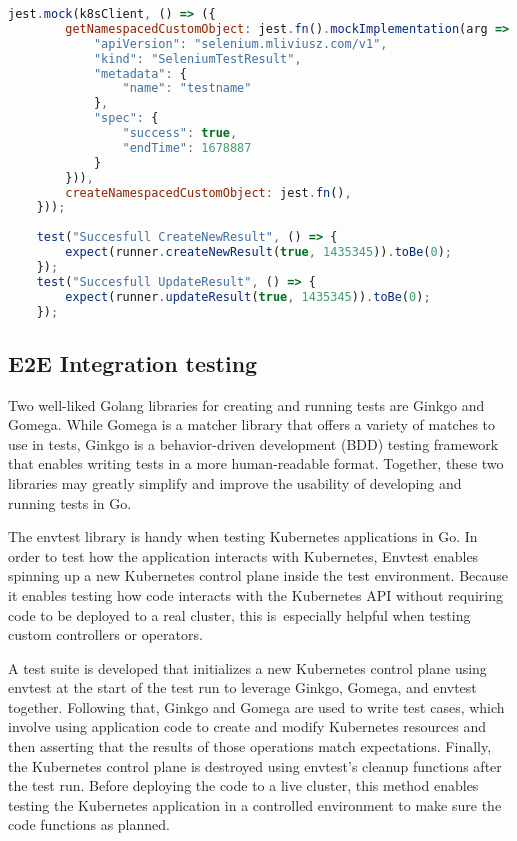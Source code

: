 \begin{lstlisting}[language={JavaScript}]
	jest.mock(k8sClient, () => ({
		getNamespacedCustomObject: jest.fn().mockImplementation(arg => ({
			"apiVersion": "selenium.mliviusz.com/v1",
			"kind": "SeleniumTestResult",
			"metadata": {
				"name": "testname"
			},
			"spec": {
				"success": true,
				"endTime": 1678887
			}
		})),
		createNamespacedCustomObject: jest.fn(),
	}));
	
	test("Succesfull CreateNewResult", () => {
		expect(runner.createNewResult(true, 1435345)).toBe(0);
	});
	test("Succesfull UpdateResult", () => {
		expect(runner.updateResult(true, 1435345)).toBe(0);
	});
\end{lstlisting}
\subsection{E2E Integration testing}

Two well-liked Golang libraries for creating and running tests are Ginkgo and Gomega. While Gomega is a matcher library that offers a variety of matches to use in tests, Ginkgo is a behavior-driven development (BDD) testing framework that enables writing tests in a more human-readable format. Together, these two libraries may greatly simplify and improve the usability of developing and running tests in Go.

The envtest library is handy when testing Kubernetes applications in Go. In order to test how the application interacts with Kubernetes, Envtest enables spinning up a new Kubernetes control plane inside the test environment. Because it enables testing how code interacts with the Kubernetes API without requiring code to be deployed to a real cluster, this is especially helpful when testing custom controllers or operators.

A test suite is developed that initializes a new Kubernetes control plane using envtest at the start of the test run to leverage Ginkgo, Gomega, and envtest together. Following that, Ginkgo and Gomega are used to write test cases, which involve using application code to create and modify Kubernetes resources and then asserting that the results of those operations match expectations. Finally, the Kubernetes control plane is destroyed using envtest's cleanup functions after the test run. Before deploying the code to a live cluster, this method enables testing the Kubernetes application in a controlled environment to make sure the code functions as planned.

